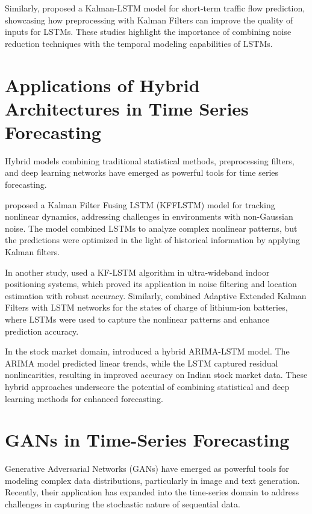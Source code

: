 Similarly, \textcite{fang_kalman-lstm_2021} proposed a Kalman-LSTM model for short-term traffic flow prediction, showcasing how preprocessing with Kalman Filters can improve the quality of inputs for LSTMs. These studies highlight the importance of combining noise reduction techniques with the temporal modeling capabilities of LSTMs.

\section{Applications of Hybrid Architectures in Time Series Forecasting}
Hybrid models combining traditional statistical methods, preprocessing filters, and deep learning networks have emerged as powerful tools for time series forecasting.  

\textcite{song_improved_2022} proposed a Kalman Filter Fusing LSTM (KFFLSTM) model for tracking nonlinear dynamics, addressing challenges in environments with non-Gaussian noise. The model combined LSTMs to analyze complex nonlinear patterns, but the predictions were optimized in the light of historical information by applying Kalman filters.  

In another study, \textcite{tian_application_2024} used a KF-LSTM algorithm in ultra-wideband indoor positioning systems, which proved its application in noise filtering and location estimation with robust accuracy. Similarly, \textcite{wang_hybrid_2024} combined Adaptive Extended Kalman Filters with LSTM networks for the states of charge of lithium-ion batteries, where LSTMs were used to capture the nonlinear patterns and enhance prediction accuracy. 

In the stock market domain, \textcite{sahni_neoteric_2022} introduced a hybrid ARIMA-LSTM model. The ARIMA model predicted linear trends, while the LSTM captured residual nonlinearities, resulting in improved accuracy on Indian stock market data. These hybrid approaches underscore the potential of combining statistical and deep learning methods for enhanced forecasting.  

\section{GANs in Time-Series Forecasting}

Generative Adversarial Networks (GANs) have emerged as powerful tools for modeling complex data distributions, particularly in image and text generation. Recently, their application has expanded into the time-series domain to address challenges in capturing the stochastic nature of sequential data.

